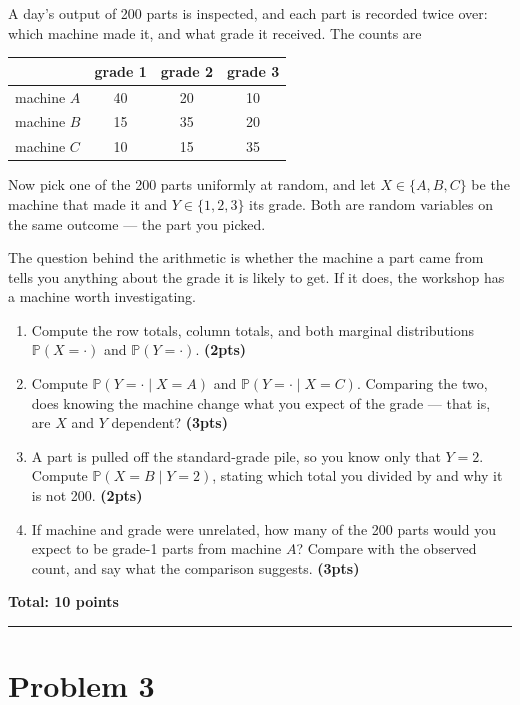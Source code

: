 \documentclass[11pt,a4paper]{article}
\newcommand{\pts}[1]{\hfill\textbf{(#1pts)}}
\newcommand{\total}[1]{\par\medskip\noindent\textbf{Total: #1 points}}
\newcommand{\PP}{\mathbb{P}}
\newenvironment{parts}
  {\begin{enumerate}\setlength{\itemsep}{0.45em}\setlength{\parskip}{0pt}}
  {\end{enumerate}}
\begin{document}
\noindent
A day's output of 200 parts is inspected, and each part is recorded twice over:
which machine made it, and what grade it received. The counts are

\begin{center}
\begin{tabular}{lccc}
\toprule
        & grade 1 & grade 2 & grade 3 \\
\midrule
machine $A$   & 40 & 20 & 10 \\
machine $B$   & 15 & 35 & 20 \\
machine $C$   & 10 & 15 & 35 \\
\bottomrule
\end{tabular}
\end{center}

\noindent
Now pick one of the 200 parts uniformly at random, and let $X \in \{A,B,C\}$ be
the machine that made it and $Y \in \{1,2,3\}$ its grade. Both are random
variables on the same outcome — the part you picked.

The question behind the arithmetic is whether the machine a part came from tells
you anything about the grade it is likely to get. If it does, the workshop has a
machine worth investigating.

\begin{parts}
  \item Compute the row totals, column totals, and both marginal distributions
        $\PP(X = \cdot)$ and $\PP(Y = \cdot)$. \pts{2}
  \item Compute $\PP(Y = \cdot \mid X = A)$ and $\PP(Y = \cdot \mid X = C)$.
        Comparing the two, does knowing the machine change what you expect of the
        grade — that is, are $X$ and $Y$ dependent? \pts{3}
  \item A part is pulled off the standard-grade pile, so you know only that
        $Y = 2$. Compute $\PP(X = B \mid Y = 2)$, stating which total you divided
        by and why it is not 200. \pts{2}
  \item If machine and grade were unrelated, how many of the 200 parts would you
        expect to be grade-1 parts from machine $A$? Compare with the observed
        count, and say what the comparison suggests. \pts{3}
\end{parts}

\total{10}

\bigskip
\hrule
\bigskip

\section*{Problem 3}
\end{document}
